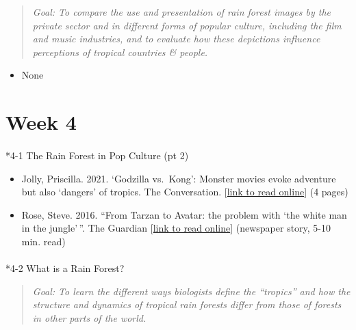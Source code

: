 \documentclass[
  10pt,
  letterpaper,
  oneside,
  open=any]{scrbook}
\makeatletter
\let\oldparagraph\paragraph
\renewcommand{\paragraph}{
    \@ifstar
      \xxxParagraphStar
      \xxxParagraphNoStar
  }
\newcommand{\xxxParagraphStar}[1]{\oldparagraph*{#1}\mbox{}}
\newcommand{\xxxParagraphNoStar}[1]{\oldparagraph{#1}\mbox{}}
\providecommand{\tightlist}{%
  \setlength{\itemsep}{0pt}\setlength{\parskip}{0pt}}
\makeatother
\begin{document}
\begin{quote}
\emph{Goal: To compare the use and presentation of rain forest images by
the private sector and in different forms of popular culture, including
the film and music industries, and to evaluate how these depictions
influence perceptions of tropical countries \& people.}
\end{quote}

\begin{itemize}
\tightlist
\item
  None
\end{itemize}

\section*{Week 4}\label{week-4}


\paragraph*{4-1 The Rain Forest in Pop Culture (pt
2)}\label{the-rain-forest-in-pop-culture-pt-2}

\begin{itemize}
\item
  Jolly, Priscilla. 2021. `Godzilla vs.~Kong': Monster movies evoke
  adventure but also `dangers' of tropics. The Conversation.
  {[}\href{https://theconversation.com/godzilla-vs-kong-monster-movies-evoke-adventure-but-also-dangers-of-tropics-158105}{link
  to read online}{]} (4 pages)
\item
  Rose, Steve. 2016. ``From Tarzan to Avatar: the problem with `the
  white man in the jungle'\,''. The Guardian
  {[}\href{https://www.theguardian.com/film/2016/jul/06/why-the-white-man-in-the-jungle-film-wont-die}{link
  to read online}{]} (newspaper story, 5-10 min. read)
\end{itemize}

\paragraph*{4-2 What is a Rain Forest?}\label{what-is-a-rain-forest}

\begin{quote}
\emph{Goal: To learn the different ways biologists define the
``tropics'' and how the structure and dynamics of tropical rain forests
differ from those of forests in other parts of the world.}
\end{quote}
\end{document}
